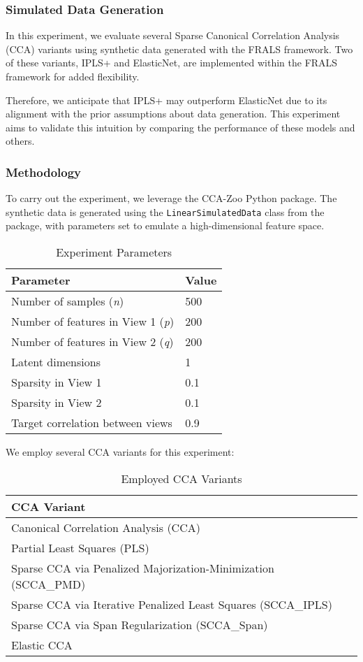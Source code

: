 \subsubsection{Simulated Data Generation}\label{subsubsec:simulated-data-generation}

In this experiment, we evaluate several Sparse Canonical Correlation Analysis (CCA) variants using synthetic data generated with the FRALS framework.
Two of these variants, IPLS+ and ElasticNet, are implemented within the FRALS framework for added flexibility.

Therefore, we anticipate that IPLS+ may outperform ElasticNet due to its alignment with the prior assumptions about data generation.
This experiment aims to validate this intuition by comparing the performance of these models and others.

\subsubsection{Methodology}

To carry out the experiment, we leverage the CCA-Zoo Python package.
The synthetic data is generated using the \texttt{LinearSimulatedData} class from the package, with parameters set to emulate a high-dimensional feature space.

\begin{table}[h]
\centering
\caption{Experiment Parameters}
\begin{tabular}{l|l}
\textbf{Parameter} & \textbf{Value} \\
\hline
Number of samples (\textit{n}) & 500 \\
Number of features in View 1 (\textit{p}) & 200 \\
Number of features in View 2 (\textit{q}) & 200 \\
Latent dimensions & 1 \\
Sparsity in View 1 & 0.1 \\
Sparsity in View 2 & 0.1 \\
Target correlation between views & 0.9 \\
\end{tabular}
\label{table:experiment-parameters}
\end{table}

We employ several CCA variants for this experiment:

\begin{table}[h]
\centering
\caption{Employed CCA Variants}
\begin{tabular}{l}
\textbf{CCA Variant} \\
\hline
Canonical Correlation Analysis (CCA) \\
Partial Least Squares (PLS) \\
Sparse CCA via Penalized Majorization-Minimization (SCCA\_PMD) \\
Sparse CCA via Iterative Penalized Least Squares (SCCA\_IPLS) \\
Sparse CCA via Span Regularization (SCCA\_Span) \\
Elastic CCA \\
\end{tabular}
\label{table:cca-variants}
\end{table}

